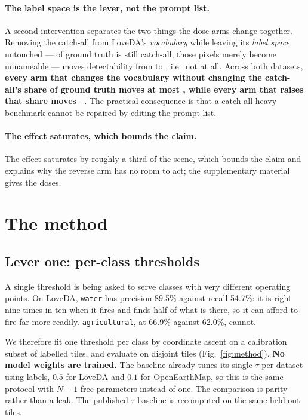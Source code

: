 \documentclass[10pt,a4paper]{article}                        %
\newcommand{\best}[1]{\textbf{#1}}
\newcommand{\suppref}[1]{the supplementary material}
\begin{document}
\paragraph{The label space is the lever, not the prompt list.} A second
intervention separates the two things the dose arms change together. Removing the
catch-all from LoveDA's \emph{vocabulary} while leaving its \emph{label space}
untouched --- \ivSatShare{} of ground truth is still catch-all, those pixels
merely become unnameable --- moves detectability from \ivRevBase{} to \ivRev{},
i.e.\ not at all. Across both datasets, \best{every arm that changes the
vocabulary without changing the catch-all's share of ground truth moves at most
\ivVocabMax{}, while every arm that raises that share moves \ivB{}--\ivBtwo{}}.
The practical consequence is that a catch-all-heavy benchmark cannot be repaired
by editing the prompt list.

\paragraph{The effect saturates, which bounds the claim.} The effect saturates by roughly a third of the scene, which bounds the claim and explains why the reverse arm has no room to act; \suppref{sup:saturate} gives the doses.

\section{The method}
\label{sec:built}

\subsection{Lever one: per-class thresholds}
\label{sec:method}

A single threshold is being asked to serve classes with very different operating
points. On LoveDA, \texttt{water} has precision 89.5\% against
recall 54.7\%: it is right nine times in ten when it fires and finds
half of what is there, so it can afford to fire far more readily.
\texttt{agricultural}, at 66.9\% against 62.0\%, cannot.

We therefore fit one threshold per class by coordinate ascent on a calibration
subset of labelled tiles, and evaluate on disjoint tiles (Fig.~\ref{fig:method}). \best{No model weights
are trained.} The baseline already tunes its single $\tau$ per dataset using labels, $0.5$ for
LoveDA and $0.1$ for OpenEarthMap, so this is the same protocol with $N-1$ free
parameters instead of one. The comparison is parity rather than a leak. The published-$\tau$ baseline is recomputed on the same
held-out tiles.
\end{document}

